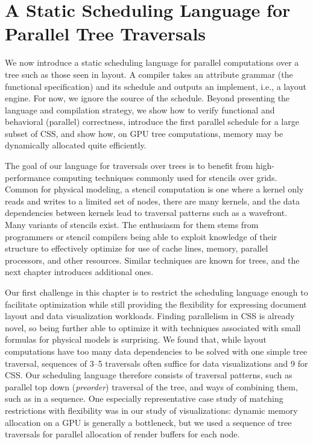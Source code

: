 \chapter{A Static Scheduling Language for Parallel Tree Traversals}
\label{chap:3}

We now introduce a static scheduling language for parallel computations over a tree such as those seen in layout. A compiler takes an attribute grammar (the functional specification) and its schedule and outputs an implement, i.e., a layout engine. For now, we ignore the source of the schedule. Beyond presenting the language and compilation strategy, we show how to verify functional and behavioral (parallel) correctness, introduce the first parallel schedule for a large subset of CSS, and show how, on GPU tree computations, memory may be dynamically allocated quite efficiently.

The goal of our language for traversals over trees is to benefit from high-performance computing techniques  commonly used for stencils over grids. Common for physical modeling, a stencil computation is one where a kernel only reads and writes to a limited set of nodes, there are many kernels, and the data dependencies between kernels lead to traversal patterns such as a wavefront. Many variants of stencils exist. The enthusiasm for them stems from programmers or stencil compilers being able to exploit knowledge of their structure to effectively optimize for use of cache lines, memory, parallel processors, and other resources. Similar techniques are known for trees, and the next chapter introduces additional ones.

Our first challenge in this chapter is to restrict the scheduling language enough to facilitate optimization while still providing the flexibility for expressing  document layout and data visualization workloads. Finding parallelism in CSS is already novel,  so being further able to optimize it with techniques associated with small formulas for physical models is surprising. We found that, while layout computations have too many data dependencies to be solved with one simple tree traversal, sequences of 3--5 traversals often suffice for data visualizations and 9 for CSS. Our scheduling language therefore consists of traversal patterns, such as parallel top down (\emph{preorder}) traversal of the tree, and ways of combining them, such as in a sequence. One especially representative case study of matching restrictions with flexibility was in our study of  visualizations: dynamic memory allocation on a GPU is generally a bottleneck, but we used a sequence of tree traversals for parallel allocation of render buffers for each node.

